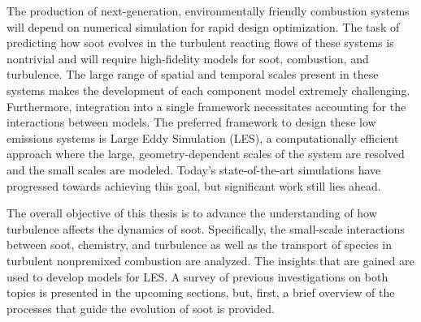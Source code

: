 The production of next-generation, environmentally friendly combustion systems will depend on numerical simulation for rapid design optimization. The task of predicting how soot evolves in the turbulent reacting flows of these systems is nontrivial and will require high-fidelity models for soot, combustion, and turbulence. The large range of spatial and temporal scales present in these systems makes the development of each component model extremely challenging. Furthermore, integration into a single framework necessitates accounting for the interactions between models. The preferred framework to design these low emissions systems is Large Eddy Simulation (LES), a computationally efficient approach where the large, geometry-dependent scales of the system are resolved and the small scales are modeled. Today's state-of-the-art simulations have progressed towards achieving this goal, but significant work still lies ahead.

The overall objective of this thesis is to advance the understanding of how turbulence affects the dynamics of soot. Specifically, the small-scale interactions between soot, chemistry, and turbulence as well as the transport of species in turbulent nonpremixed combustion are analyzed. The insights that are gained are used to develop models for LES. A survey of previous investigations on both topics is presented in the upcoming sections, but, first, a brief overview of the processes that guide the evolution of soot is provided.





